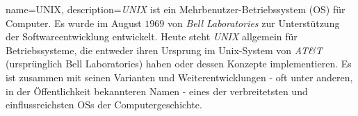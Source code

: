 	{%
		name={UNIX},
		description={\textit{UNIX} ist ein Mehrbenutzer-Betriebssystem (OS) für Computer. Es wurde im August $1969$ von \textit{Bell Laboratories} zur Unterstützung der Softwareentwicklung entwickelt. Heute steht \textit{UNIX} allgemein für Betriebssysteme, die entweder ihren Ursprung im Unix-System von \textit{AT\&T} (ursprünglich Bell Laboratories) haben oder dessen Konzepte implementieren. Es ist zusammen mit seinen Varianten und Weiterentwicklungen - oft unter anderen, in der Öffentlichkeit bekannteren Namen - eines der verbreitetsten und einflussreichsten OSs der Computergeschichte.}
	}

\fi

